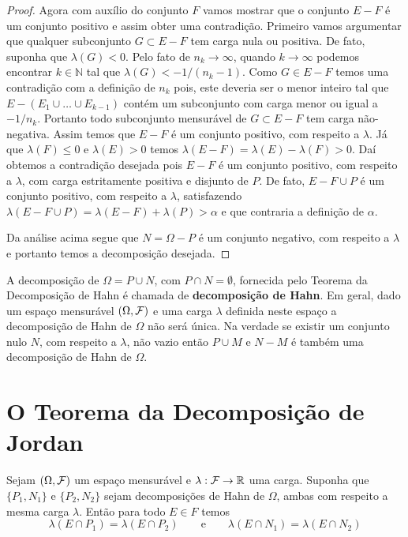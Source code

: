 \begin{proof}
Agora com auxílio do conjunto $F$ vamos mostrar que o 
conjunto $E-F$ é um conjunto positivo e assim obter uma contradição.
Primeiro vamos argumentar que qualquer subconjunto 
$G\subset E-F$ tem carga nula ou positiva. 
De fato, suponha que $\lambda(G)<0$. 
Pelo fato de $n_k\to\infty$, quando $k\to\infty$ 
podemos encontrar $k\in\mathbb{N}$ tal que 
$\lambda(G)<-1/(n_k-1)$. Como $G\in E-F$ temos
uma contradição com a definição de $n_k$
pois, este deveria ser o menor inteiro tal que 
$E-(E_1\cup\ldots\cup E_{k-1})$
contém um subconjunto com carga menor ou igual 
a $-1/n_k$. Portanto todo subconjunto mensurável 
de $G\subset E-F$ tem carga não-negativa.
Assim temos que $E-F$ é um conjunto positivo,
com respeito a $\lambda$. 
Já que $\lambda(F)\leq 0$ e $\lambda(E)>0$ temos  
$\lambda(E-F)=\lambda(E)-\lambda(F)>0$.
Daí obtemos a contradição desejada pois 
$E-F$ é um conjunto positivo, com respeito a $\lambda$,
com carga estritamente positiva e disjunto de $P$. De fato,
$E-F\cup P$ é um conjunto positivo, com respeito a $\lambda$,
satisfazendo $\lambda(E-F\cup P)= \lambda(E-F)+\lambda(P)>\alpha$
e que contraria a definição de $\alpha$. 

Da análise acima segue que $N=\Omega-P$ é um 
conjunto negativo, com respeito a $\lambda$ e 
portanto temos a decomposição desejada.
\end{proof}





\begin{observacao}
	A decomposição de $\Omega=P\cup N$, com $P\cap N=\emptyset$, 
	fornecida pelo Teorema da Decomposição 
	de Hahn é chamada de {\bf decomposição de Hahn}. 
	Em geral, dado um espaço mensurável $(\Omega,\mathcal{F})$ e 
	uma carga $\lambda$ definida neste espaço a decomposição de
	Hahn de $\Omega$ não será única. Na verdade se existir um
	conjunto nulo $N$, com respeito a $\lambda$, não vazio 
	então $P\cup M$ e $N-M$ é também uma decomposição de 
	Hahn de $\Omega$.
\end{observacao}

 









\section{O Teorema da Decomposição de Jordan}

\begin{lema}\label{lema-dec-jordan-aux1}
	Sejam $(\Omega,\mathcal{F})$ um espaço mensurável e $\lambda:\mathcal{F}\to\mathbb{R}$
	uma carga. Suponha que $\{P_1,N_1\}$ e $\{P_2,N_2\}$ sejam
	decomposições de Hahn de $\Omega$, ambas com respeito a mesma
	carga $\lambda$. Então para todo $E\in F$ temos 
	\[
	\lambda(E \cap P_1) = \lambda(E \cap P_2)
	\qquad\text{e}\qquad
	\lambda(E \cap N_1) = \lambda(E \cap N_2)
	\]
\end{lema}

